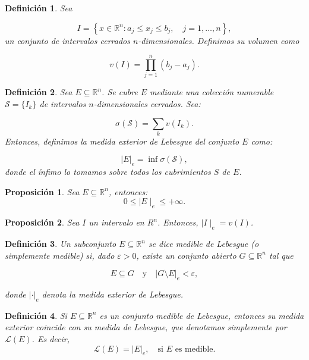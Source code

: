 \documentclass{report}
\newtheorem{prop}{Proposición}[section]
\newtheorem{dfn}{Definición}[section]
\begin{document}
\begin{dfn}
Sea

\[
I = \left\{ x \in \mathbb{R}^n : a_j \leq x_j \leq b_j, \quad j = 1, \dots, n \right\},
\]
un conjunto de intervalos cerrados \( n \)-dimensionales. Definimos su \emph{volumen} como

\[
v(I) = \prod_{j=1}^{n} (b_j - a_j).
\]
\end{dfn}

\begin{dfn}
Sea \( E \subseteq \mathbb{R}^n \). Se cubre \( E \) mediante una colección numerable \( \mathcal{S} = \{ I_k \} \)
de intervalos \( n \)-dimensionales cerrados. Sea:

\[
\sigma(\mathcal{S}) = \sum_{k} v(I_k).
\]
Entonces, definimos la \textit{medida exterior de Lebesgue} del conjunto \( E  \) como:

\begin{equation*}
|E|_e = \inf \sigma(\mathcal{S}),
\end{equation*}
donde el ínfimo lo tomamos sobre todos los cubrimientos $S$ de $E$.
\end{dfn}

\begin{prop}
    Sea \( E \subseteq \mathbb{R}^n \), entonces:
    \begin{equation*}
        0 \leq \mid E \mid_e \leq +\infty.
    \end{equation*}
\end{prop}

\begin{prop}
    Sea $I$ un intervalo en $R^n$. Entonces, $\mid I \mid_e = v(I)$.
\end{prop}


\begin{dfn}
Un subconjunto \( E \subseteq \mathbb{R}^n \) se dice \textit{medible de Lebesgue} (o simplemente \textit{medible}) si, dado \( \varepsilon > 0 \),
existe un conjunto abierto \( G \subseteq \mathbb{R}^n \) tal que

\[
E \subseteq G \quad \text{y} \quad |G \setminus E|_e < \varepsilon,
\]

donde \( | \cdot |_e \) denota la medida exterior de Lebesgue.
\end{dfn}

\begin{dfn}
Si \( E \subseteq \mathbb{R}^n \) es un conjunto medible de Lebesgue, entonces su \textit{medida exterior} coincide con su \textit{medida de Lebesgue},
que denotamos simplemente por \( \mathscr{L}(E) \). Es decir,
\[
\mathscr{L}(E)  = |E|_e, \quad \text{si } E \text{ es medible}.
\]
\end{dfn}
\end{document}
